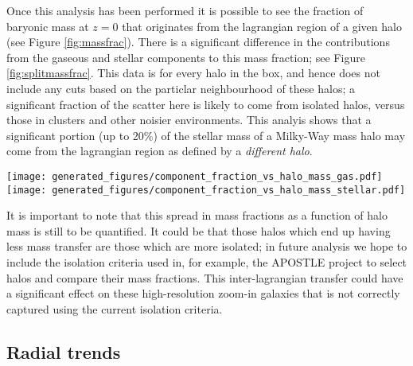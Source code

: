 Once this analysis has been performed it is possible to see the fraction of
baryonic mass at $z=0$ that originates from the lagrangian region of a given
halo (see Figure \ref{fig:massfrac}). There is a significant difference in the
contributions from the gaseous and stellar components to this mass fraction;
see Figure \ref{fig:splitmassfrac}. This data is for every halo in the box, and
hence does not include any cuts based on the particlar neighbourhood of these
halos; a significant fraction of the scatter here is likely to come from
isolated halos, versus those in clusters and other noisier environments. This
analyis shows that a significant portion (up to 20\%) of the stellar mass of a
Milky-Way mass halo may come from the lagrangian region as defined by a
\emph{different halo}.

\begin{figure*} \centering
	\texttt{[image: generated\_figures/component\_fraction\_vs\_halo\_mass\_gas.pdf]}
	\texttt{[image: generated\_figures/component\_fraction\_vs\_halo\_mass\_stellar.pdf]}
	\caption{Left: fraction of gaseous mass at $z=0$ in each halo from each
	component; right: fraction of stellar mass at $z=0$ from each
	component. Note that there is significantly more transfer shown in the
	gaseous component. Gas that is transferred between lagrangian regions
	must be given time to cool before being able to form stars. As the
	events that enable transfer are typically very energetic (AGN, stellar
	feedback, accretion), it is unlikely that the cooling time will be
	short enough to form stars by the end of the simulation for most
	transfer.} \label{fig:splitmassfrac} \end{figure*}

It is important to note that this spread in mass fractions as a function of
halo mass is still to be quantified. It could be that those halos which
end up having less mass transfer are those which are more isolated; in future
analysis we hope to include the isolation criteria used in, for example, the
APOSTLE project \citep{fattahi2016} to select halos and compare their mass
fractions. This inter-lagrangian transfer could have a significant effect
on these high-resolution zoom-in galaxies that is not correctly captured
using the current isolation criteria.

\subsection{Radial trends}

